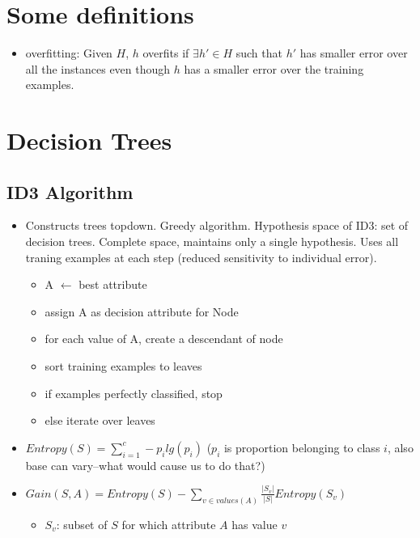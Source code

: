\documentclass[11pt]{article}
\begin{document}
\medskip                        %

\section{Some definitions}
\begin{itemize}
\item overfitting: Given $H$, $h$ overfits if $\exists h' \in H$ such that $h'$ has smaller error over all the instances even though $h$ has a smaller error over the training examples.
\end{itemize}

\section{Decision Trees}

\subsection{ID3 Algorithm}
\begin{itemize}
\item Constructs trees topdown. Greedy algorithm. Hypothesis space of ID3: set of decision trees. Complete space, maintains only a single hypothesis. Uses all traning examples at each step (reduced sensitivity to individual error).
\begin{itemize}
\item A $\leftarrow$ best attribute
\item assign A as decision attribute for Node
\item for each value of A, create a descendant of node
\item sort training examples to leaves
\item if examples perfectly classified, stop
\item else iterate over leaves
\end{itemize}
\item $Entropy(S) = \sum_{i=1}^{c} -p_i lg(p_i)$ ($p_i$ is proportion belonging to class $i$, also base can vary--what would cause us to do that?)
\item $Gain(S,A) = Entropy(S) - \sum_{v \in values(A)} \frac{|S_v|}{|S|} Entropy(S_v)$
\begin{itemize}
\item $S_v$: subset of $S$ for which attribute $A$ has value $v$
\end{itemize}
\end{itemize}
\end{document}
